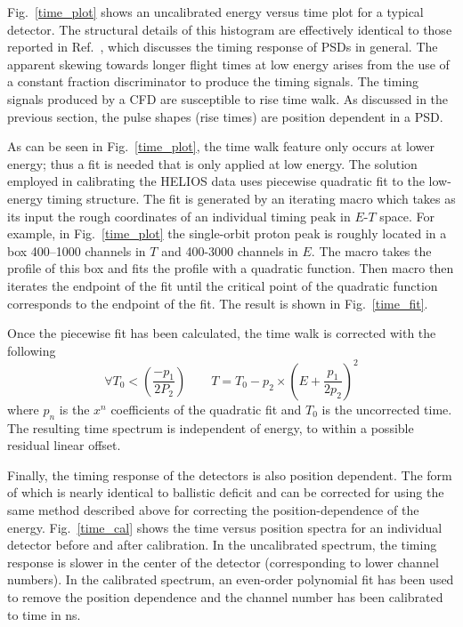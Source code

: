 Fig.~\ref{time_plot} shows an uncalibrated energy versus time plot for a typical detector.  The structural details of this histogram are effectively identical to those reported in Ref.~\cite[Fig.~9]{Bennett_1992}, which discusses the timing response of PSDs in general.  The apparent skewing towards longer flight times at low energy arises from the use of a constant fraction discriminator to produce the timing signals.   The timing signals produced by a CFD are susceptible to rise time walk.  As discussed in the previous section, the pulse shapes (rise times) are position dependent in a PSD.  

As can be seen in Fig.~\ref{time_plot}, the time walk feature only occurs at lower energy; thus a fit is needed that is only applied at low energy.  The solution employed in calibrating the HELIOS data uses piecewise quadratic fit to the low-energy timing structure.  The fit is generated by an iterating macro which takes as its input the rough coordinates of an individual timing peak in $E$-$T$ space.  For example, in Fig.~\ref{time_plot} the single-orbit proton peak is roughly located in a box 400--1000 channels in $T$ and 400-3000 channels in $E$.  The macro takes the profile of this box and fits the profile with a quadratic function.  Then macro then iterates the endpoint of the fit until the critical point of the quadratic function corresponds to the endpoint of the fit.  The result is shown in Fig.~\ref{time_fit}.


Once the piecewise fit has been calculated, the time walk is corrected with the following 
\begin{equation}
\forall T_0<\left(\frac{-p_1}{2P_2}\right)\qquad T=T_0-p_2\times \left(E+ \frac{p_1}{2 p_2}\right)^2
\label{eq:time}
\end{equation}
where $p_n$ is the $x^n$ coefficients of the quadratic fit and $T_0$ is the uncorrected time.  The resulting time spectrum is independent of energy, to within a possible residual linear offset.  

Finally, the timing response of the detectors is also position dependent.  The form of which is nearly identical to ballistic deficit and can be corrected for using the same method described above for correcting the position-dependence of the energy.  Fig.~\ref{time_cal} shows the time versus position spectra for an individual detector before and after calibration.  In the uncalibrated spectrum, the timing response is slower in the center of the detector (corresponding to lower channel numbers). In the calibrated spectrum, an even-order polynomial fit has been used to remove the position dependence and the channel number has been calibrated to time in ns.

